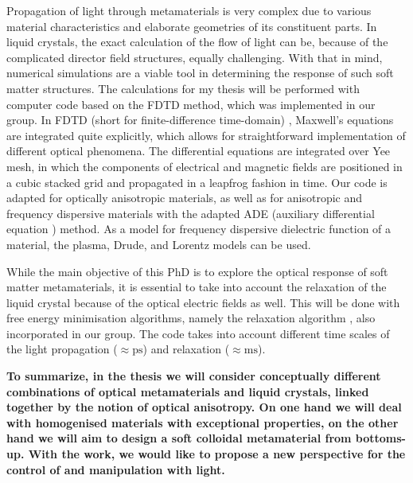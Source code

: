 \documentclass[a4paper,11pt]{article}
\begin{document}
Propagation of light through metamaterials is very complex due to various material characteristics and elaborate geometries of its constituent parts. 
In liquid crystals, the exact calculation of the flow of light can be, because of the complicated director field structures, equally challenging.
With that in mind, numerical simulations are a viable tool in determining the response of such soft matter structures. 
The calculations for my thesis will be performed with computer code based on the FDTD method, which was implemented in our group.
In FDTD (short for finite-difference time-domain) \cite{taflove1}, Maxwell's equations are integrated quite explicitly, which allows for straightforward implementation of different optical phenomena.
The differential equations are integrated over Yee mesh, in which the components of electrical and magnetic fields are positioned in a cubic stacked grid and propagated in a leapfrog fashion in time. 
Our code is adapted for optically anisotropic materials, as well as for anisotropic and frequency dispersive materials with the adapted ADE (auxiliary differential equation \cite{taflove1}) method. 
As a model for frequency dispersive dielectric function of a material, the plasma, Drude, and Lorentz models can be used. 

While the main objective of this PhD is to explore the optical response of soft matter metamaterials, it is essential to take into account the relaxation of the liquid crystal because of the optical electric fields as well. 
This will be done with free energy minimisation algorithms, namely the relaxation algorithm \cite{ravnik-2009-lc-modelling}, also incorporated in our group. 
The code takes into account different time scales of the light propagation ($\approx \mathrm{ps}$) and relaxation ($\approx \mathrm{ms}$). 

{ \bfseries To summarize, in the thesis we will consider conceptually different combinations of optical metamaterials and liquid crystals, linked together by the notion of optical anisotropy. 
On one hand we will deal with homogenised materials with exceptional properties, on the other hand we will aim to design a soft colloidal metamaterial from bottoms-up. 
With the work, we would like to propose a new perspective for the control of and manipulation with light. 
}
\end{document}
